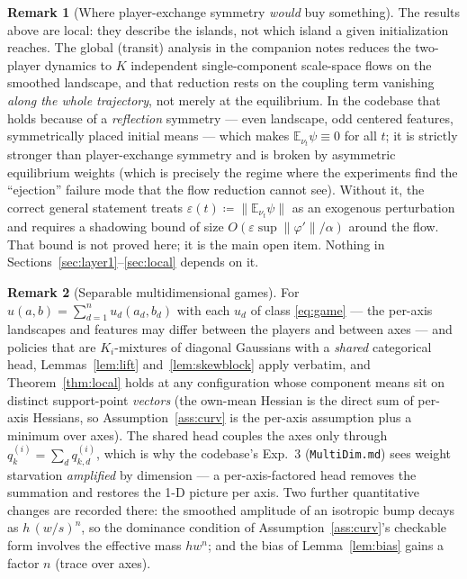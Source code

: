 \documentclass[11pt]{article}
\theoremstyle{definition}
\newtheorem{remark}{Remark}
\newcommand{\E}{\mathbb{E}}
\begin{document}
\begin{remark}[Where player-exchange symmetry \emph{would} buy
something]\label{rem:where-symmetry-helps}
The results above are local: they describe the islands, not which island a
given initialization reaches. The global (transit) analysis in the companion
notes reduces the two-player dynamics to $K$ independent single-component
scale-space flows on the smoothed landscape, and that reduction rests on the
coupling term vanishing \emph{along the whole trajectory}, not merely at the
equilibrium. In the codebase that holds because of a \emph{reflection}
symmetry --- even landscape, odd centered features, symmetrically placed
initial means --- which makes $\E_{\nu_t}\psi \equiv 0$ for all $t$; it is
strictly stronger than player-exchange symmetry and is broken by asymmetric
equilibrium weights (which is precisely the regime where the experiments find
the ``ejection'' failure mode that the flow reduction cannot see). Without it,
the correct general statement treats $\varepsilon(t) \coloneqq
\|\E_{\nu_t}\psi\|$ as an exogenous perturbation and requires a shadowing bound
of size $O(\varepsilon \sup\|\varphi'\| / \alpha)$ around the flow. That bound
is not proved here; it is the main open item. Nothing in
Sections~\ref{sec:layer1}--\ref{sec:local} depends on it.
\end{remark}

\begin{remark}[Separable multidimensional games]\label{rem:multidim}
For $u(a,b) = \sum_{d=1}^{n} u_d(a_d, b_d)$ with each $u_d$ of class
\eqref{eq:game} --- the per-axis landscapes and features may differ between the
players and between axes --- and policies that are $K_i$-mixtures of diagonal
Gaussians with a \emph{shared} categorical head, Lemmas~\ref{lem:lift}
and~\ref{lem:skewblock} apply verbatim, and Theorem~\ref{thm:local} holds at
any configuration whose component means sit on distinct support-point
\emph{vectors} (the own-mean Hessian is the direct sum of per-axis Hessians, so
Assumption~\ref{ass:curv} is the per-axis assumption plus a minimum over axes).
The shared head couples the axes only through $q^{(i)}_k = \sum_d q^{(i)}_{k,d}$,
which is why the codebase's Exp.~3 (\texttt{MultiDim.md}) sees weight
starvation \emph{amplified} by dimension --- a per-axis-factored head removes
the summation and restores the 1-D picture per axis. Two further quantitative
changes are recorded there: the smoothed amplitude of an isotropic bump decays
as $h\,(w/s)^{n}$, so the dominance condition of Assumption~\ref{ass:curv}'s
checkable form involves the effective mass $h w^{n}$; and the bias of
Lemma~\ref{lem:bias} gains a factor $n$ (trace over axes).
\end{remark}
\end{document}
